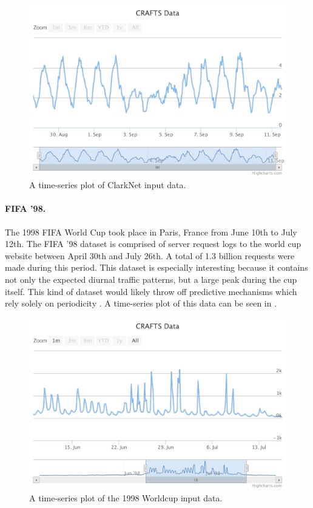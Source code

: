 \begin{figure}
\centering
\includegraphics[width=\textwidth]{charts/clarknet.pdf}
\caption{A time-series plot of ClarkNet input data.}
\label{fig:clarknet}
\end{figure}

\paragraph{FIFA '98.} The 1998 FIFA World Cup took place in Paris, France from June 10th to July 12th. The FIFA '98 dataset is comprised of server request logs to the world cup website between April 30th and July 26th. A total of 1.3 billion requests were made during this period. This dataset is especially interesting because it contains not only the expected diurnal traffic patterns, but a large peak during the cup itself. This kind of dataset would likely throw off predictive mechanisms which rely solely on periodicity \cite{worldcup}. A time-series plot of this data can be seen in .

\begin{figure}
\centering
\includegraphics[width=\textwidth]{charts/worldcup.pdf}
\caption{A time-series plot of the 1998 Worldcup input data.}
\label{fig:worldcup}
\end{figure}
